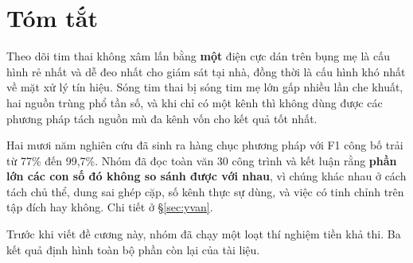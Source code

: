 \section{Tóm tắt}

Theo dõi tim thai không xâm lấn bằng \textbf{một} điện cực dán trên bụng mẹ là cấu hình rẻ nhất và
dễ đeo nhất cho giám sát tại nhà, đồng thời là cấu hình khó nhất về mặt xử lý tín hiệu. Sóng tim thai
bị sóng tim mẹ lớn gấp nhiều lần che khuất, hai nguồn trùng phổ tần số, và khi chỉ có một kênh thì
không dùng được các phương pháp tách nguồn mù đa kênh vốn cho kết quả tốt nhất.

Hai mươi năm nghiên cứu đã sinh ra hàng chục phương pháp với F1 công bố trải từ 77\% đến 99,7\%.
Nhóm đã đọc toàn văn 30 công trình và kết luận rằng \textbf{phần lớn các con số đó không so sánh
được với nhau}, vì chúng khác nhau ở cách tách chủ thể, dung sai ghép cặp, số kênh thực sự dùng, và
việc có tinh chỉnh trên tập đích hay không. Chi tiết ở \S\ref{sec:yvan}.

Trước khi viết đề cương này, nhóm đã chạy một loạt thí nghiệm tiền khả thi. Ba kết quả định hình
toàn bộ phần còn lại của tài liệu.

